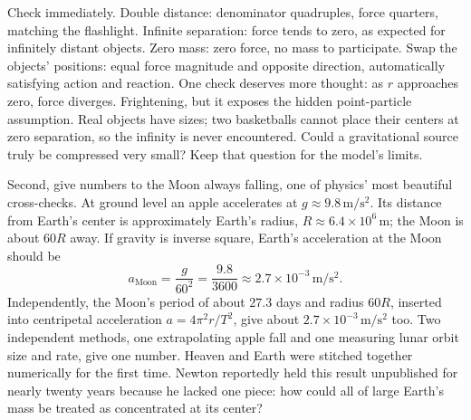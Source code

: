 Check immediately. Double distance: denominator quadruples, force quarters, matching the flashlight. Infinite separation: force tends to zero, as expected for infinitely distant objects. Zero mass: zero force, no mass to participate. Swap the objects' positions: equal force magnitude and opposite direction, automatically satisfying action and reaction. One check deserves more thought: as \(r\) approaches zero, force diverges. Frightening, but it exposes the hidden point-particle assumption. Real objects have sizes; two basketballs cannot place their centers at zero separation, so the infinity is never encountered. Could a gravitational source truly be compressed very small? Keep that question for the model's limits.

Second, give numbers to the Moon always falling, one of physics' most beautiful cross-checks. At ground level an apple accelerates at \(g \approx 9.8\,\mathrm{m/s^{2}}\). Its distance from Earth's center is approximately Earth's radius, \(R \approx 6.4\times10^{6}\,\mathrm{m}\); the Moon is about \(60 R\) away. If gravity is inverse square, Earth's acceleration at the Moon should be
\[
a_{\text{Moon}} = \frac{g}{60^{2}} = \frac{9.8}{3600} \approx 2.7\times10^{-3}\,\mathrm{m/s^{2}}.
\]
Independently, the Moon's period of about \(27.3\) days and radius \(60R\), inserted into centripetal acceleration \(a = 4\pi^{2}r/T^{2}\), give about \(2.7\times10^{-3}\,\mathrm{m/s^{2}}\) too. Two independent methods, one extrapolating apple fall and one measuring lunar orbit size and rate, give one number. Heaven and Earth were stitched together numerically for the first time. Newton reportedly held this result unpublished for nearly twenty years because he lacked one piece: how could all of large Earth's mass be treated as concentrated at its center?

